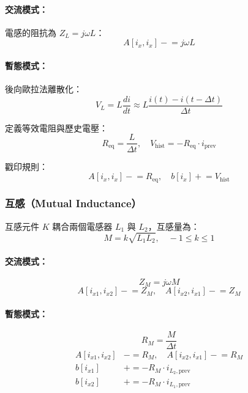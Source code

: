 \documentclass[12pt,a4paper]{article}
\begin{document}
\paragraph{交流模式：} 電感的阻抗為 $Z_L = j\omega L$：
\begin{equation}
A[i_x, i_x] \mathrel{-}= j\omega L
\end{equation}

\paragraph{暫態模式：} 後向歐拉法離散化：
\begin{equation}
V_L = L\frac{di}{dt} \approx L\frac{i(t) - i(t-\Delta t)}{\Delta t}
\end{equation}

\noindent 定義等效電阻與歷史電壓：
\begin{equation}
R_{\text{eq}} = \frac{L}{\Delta t}, \quad V_{\text{hist}} = -R_{\text{eq}} \cdot i_{\text{prev}}
\end{equation}

戳印規則：
\begin{equation}
A[i_x, i_x] \mathrel{-}= R_{\text{eq}}, \quad b[i_x] \mathrel{+}= V_{\text{hist}}
\end{equation}

\subsubsection{互感（Mutual Inductance）}

互感元件 $K$ 耦合兩個電感器 $L_1$ 與 $L_2$，互感量為：
\begin{equation}
M = k\sqrt{L_1 L_2}, \quad -1 \leq k \leq 1
\end{equation}

\paragraph{交流模式：}
\begin{equation}
Z_M = j\omega M
\end{equation}
\begin{equation}
A[i_{x1}, i_{x2}] \mathrel{-}= Z_M, \quad A[i_{x2}, i_{x1}] \mathrel{-}= Z_M
\end{equation}

\paragraph{暫態模式：}
\begin{equation}
R_M = \frac{M}{\Delta t}
\end{equation}
\begin{equation}
\begin{aligned}
A[i_{x1}, i_{x2}] &\mathrel{-}= R_M, \quad A[i_{x2}, i_{x1}] \mathrel{-}= R_M \\
b[i_{x1}] &\mathrel{+}= -R_M \cdot i_{L_2,\text{prev}} \\
b[i_{x2}] &\mathrel{+}= -R_M \cdot i_{L_1,\text{prev}}
\end{aligned}
\end{equation}
\end{document}
